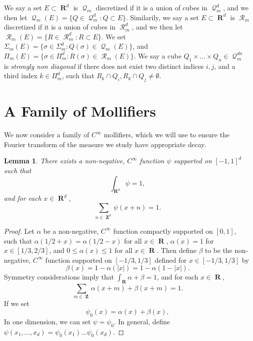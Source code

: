 \documentclass[12pt,reqno]{article}
\numberwithin{equation}{section}
\DeclareMathOperator{\RR}{\mathbf{R}}
\DeclareMathOperator{\ZZ}{\mathbf{Z}}
\newtheorem{lemma}[theorem]{Lemma}
\DeclareMathOperator{\DQ}{\mathcal{Q}}
\DeclareMathOperator{\DR}{\mathcal{R}}
\begin{document}
We say a set $E \subset \RR^d$ is $\DQ_m$ discretized if it is a union of cubes in $\DQ_m^d$, and we then let $\DQ_m(E) = \{ Q \in \DQ_m^d : Q \subset E \}$. Similarily, we say a set $E \subset \RR^d$ is $\DR_m$ discretized if it is a union of cubes in $\DR_m^d$, and we then let $\DR_m(E) = \{ R \in \DR_m^d : R \subset E \}$. We set $\Sigma_m(E) = \{ \sigma \in \Sigma_m^d : Q(\sigma) \in \DQ_m(E) \}$, and $\Pi_m(E) = \{ \sigma \in \Pi_m^d : R(\sigma) \in \DR_m(E) \}$. We say a cube $Q_1 \times \dots \times Q_n \in \DQ_m^{dn}$ is \emph{strongly non diagonal} if there does not exist two distinct indices $i,j$, and a third index $k \in \Pi_m^d$, such that $R_k \cap Q_i, R_k \cap Q_j \neq \emptyset$.

\section{A Family of Mollifiers}

We now consider a family of $C^\infty$ mollifiers, which we will use to ensure the Fourier transform of the measure we study have appropriate decay.

\begin{lemma} \label{lemma19020941290}
    There exists a non-negative, $C^\infty$ function $\psi$ supported on $[-1,1]^d$ such that
    \begin{equation} \label{equation1249015901590190}
        \int_{\RR^d} \psi = 1,
    \end{equation}
    and for each $x \in \RR^d$,
    \begin{equation} \label{equation50914902149012}
        \sum_{n \in \ZZ^d} \psi(x + n) = 1.
    \end{equation}
\end{lemma}
\begin{proof}
    Let $\alpha$ be a non-negative, $C^\infty$ function compactly supported on $[0,1]$, such that $\alpha(1/2 + x) = \alpha(1/2 - x)$ for all $x \in \RR$, $\alpha(x) = 1$ for $x \in [1/3,2/3]$, and $0 \leq \alpha(x) \leq 1$ for all $x \in \RR$. Then define $\beta$ to be the non-negative, $C^\infty$ function supported on $[-1/3,1/3]$ defined for $x \in [-1/3,1/3]$ by
    \[ \beta(x) = 1 - \alpha(|x|) = 1 - \alpha(1 - |x|). \]
    Symmetry considerations imply that $\int_{\RR} \alpha + \beta = 1$, and for each $x \in \RR$,
    \begin{equation} \label{equation129410294910}
        \sum_{m \in \ZZ} \alpha(x + m) + \beta(x + m) = 1.
    \end{equation}
    If we set
    \[ \psi_0(x) = \alpha(x) + \beta(x), \]
    In one dimension, we can set $\psi = \psi_0$. In general, define $\psi(x_1, \dots, x_d) = \psi_0(x_1) \dots \psi_0(x_d)$.
\end{proof}
\end{document}
